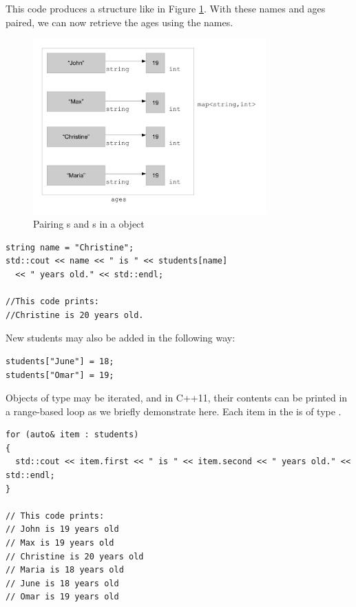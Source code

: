 This code produces a structure like in Figure \ref{fig:STL-map-diagram}. 
With these names and ages paired, we can now retrieve the ages using the names.

\begin{figure}[tb]
  \centering
  \includegraphics[width=0.8\textwidth]{diagrams/STL-map-diagram.pdf}
  \caption{Pairing s and s in a  object} \label{fig:STL-map-diagram} 
\end{figure}

\noindent\begin{minipage}{\linewidth}\begin{lstlisting}
string name = "Christine";
std::cout << name << " is " << students[name] 
  << " years old." << std::endl;

//This code prints:
//Christine is 20 years old.
\end{lstlisting}\end{minipage}

New students may also be added in the following way:

\noindent\begin{minipage}{\linewidth}\begin{lstlisting}
students["June"] = 18;
students["Omar"] = 19;
\end{lstlisting}\end{minipage}

Objects of type  may be iterated, and in C++11, their contents can be printed in a range-based  loop as we briefly demonstrate here. 
Each item in the  is of type .

\noindent\begin{minipage}{\linewidth}\begin{lstlisting}
for (auto& item : students)
{
  std::cout << item.first << " is " << item.second << " years old." << std::endl;
}

// This code prints:
// John is 19 years old
// Max is 19 years old
// Christine is 20 years old
// Maria is 18 years old
// June is 18 years old
// Omar is 19 years old
\end{lstlisting}\end{minipage}



